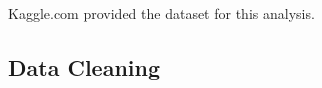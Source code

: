 \documentclass[10pt]{article}
\begin{document}
\begin{multicols}{2}
	Kaggle.com provided the dataset for this analysis.

\subsection{Data Cleaning}
	


\end{multicols}
\end{document}
